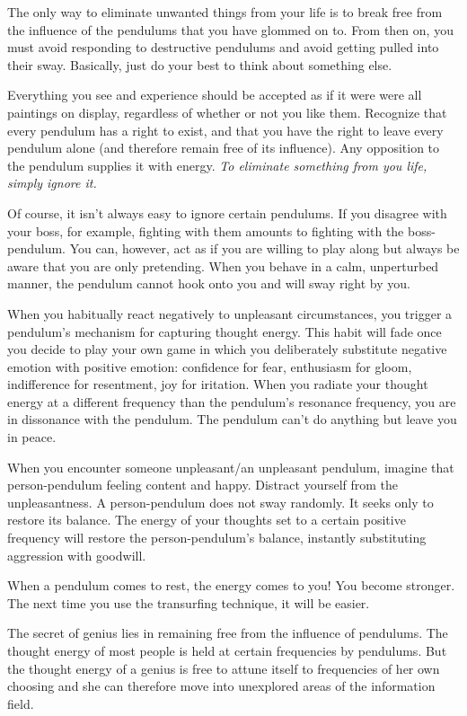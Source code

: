 \documentclass[
  openany]{book}
\begin{document}
The only way to eliminate unwanted things from your life is to break free from the influence of the pendulums that you have glommed on to. From then on, you must avoid responding to destructive pendulums and avoid getting pulled into their sway. Basically, just do your best to think about something else.

Everything you see and experience should be accepted as if it were were all paintings on display, regardless of whether or not you like them. Recognize that every pendulum has a right to exist, and that you have the right to leave every pendulum alone (and therefore remain free of its influence). Any opposition to the pendulum supplies it with energy. \emph{To eliminate something from you life, simply ignore it.}

Of course, it isn't always easy to ignore certain pendulums. If you disagree with your boss, for example, fighting with them amounts to fighting with the boss-pendulum. You can, however, act as if you are willing to play along but always be aware that you are only pretending. When you behave in a calm, unperturbed manner, the pendulum cannot hook onto you and will sway right by you.

When you habitually react negatively to unpleasant circumstances, you trigger a pendulum's mechanism for capturing thought energy. This habit will fade once you decide to play your own game in which you deliberately substitute negative emotion with positive emotion: confidence for fear, enthusiasm for gloom, indifference for resentment, joy for iritation. When you radiate your thought energy at a different frequency than the pendulum's resonance frequency, you are in dissonance with the pendulum. The pendulum can't do anything but leave you in peace.

When you encounter someone unpleasant/an unpleasant pendulum, imagine that person-pendulum feeling content and happy. Distract yourself from the unpleasantness. A person-pendulum does not sway randomly. It seeks only to restore its balance. The energy of your thoughts set to a certain positive frequency will restore the person-pendulum's balance, instantly substituting aggression with goodwill.

When a pendulum comes to rest, the energy comes to you! You become stronger. The next time you use the transurfing technique, it will be easier.

The secret of genius lies in remaining free from the influence of pendulums. The thought energy of most people is held at certain frequencies by pendulums. But the thought energy of a genius is free to attune itself to frequencies of her own choosing and she can therefore move into unexplored areas of the information field.
\end{document}
